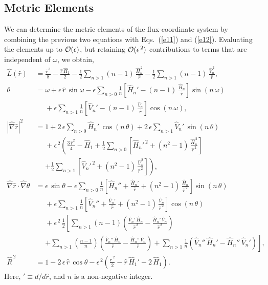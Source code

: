 \documentclass[12pt,prb,aps]{revtex4-1}
\begin{document}
\subsection{Metric Elements}
We can determine the metric elements of the flux-coordinate system by combining the previous two equations with Eqs.~(\ref{e11}) and (\ref{e12}). Evaluating the elements up to ${\cal O}(\epsilon)$, but retaining ${\cal O}(\epsilon^{\,2})$ contributions to terms that are independent of
$\omega$, we obtain,\cite{fitz93,gim}
\begin{align}\label{epdef}
\hat{L}(\hat{r})&= \frac{\hat{r}^{\,3}}{8} -\frac{\hat{r}\,\hat{H}_1}{2}-\frac{1}{2}\sum_{n>1}(n-1)\,\frac{\hat{H}_n^{\,2}}{\hat{r}}
-\frac{1}{2}\sum_{n>1}(n-1)\,\frac{\hat{V}_n^{\,2}}{\hat{r}},\\[0.5ex]
\theta &= \omega+\epsilon\,\hat{r}\,\sin\omega - \epsilon\sum_{n>0}\frac{1}{n}\left[\hat{H}_n'-(n-1)\,\frac{\hat{H}_n}{\hat{r}}\right]\sin(n\,\omega)
\nonumber\\[0.5ex]&\phantom{=}+ \epsilon\sum_{n>1}\frac{1}{n}\left[\hat{V}_n'-(n-1)\,\frac{\hat{V}_n}{\hat{r}}\right]\cos(n\,\omega),\label{e22y}\\[0.5ex]
|\hat{\nabla} \hat{r}|^2 &= 1 +2\,\epsilon\sum_{n>0}\hat{H}_n'\,\cos(n\,\theta) +2\,\epsilon\sum_{n>1}\hat{V}_n'\,\sin(n\,\theta) \nonumber\\[0.5ex]
&\phantom{=}+\epsilon^{\,2}\left(\frac{3\,\hat{r}^2}{4}-\hat{H}_1+
\frac{1}{2}\sum_{n>0}\left[\hat{H}_n'^{\,2}+(n^2-1)\,\frac{\hat{H}_n^{\,2}}{\hat{r}^{\,2}}\right]\right.\nonumber\\[0.5ex]&\phantom{=}\left.+
\frac{1}{2}\sum_{n>1}\left[\hat{V}_n'^{\,2}+(n^2-1)\,\frac{\hat{V}_n^{\,2}}{\hat{r}^{\,2}}\right]
\right),\label{e19}\\[0.5ex]
\hat{\nabla}\hat{r}\cdot\hat{\nabla}\theta&=\epsilon\,\sin\theta
-\epsilon\sum_{n>0}\frac{1}{n}\left[\hat{H}_n''+\frac{\hat{H}_n'}{\hat{r}}+(n^2-1)\,\frac{\hat{H}_n}{\hat{r}^{\,2}}\right]\sin(n\,\theta)\nonumber\\[0.5ex]&
\phantom{=}+\epsilon\sum_{n>1}\frac{1}{n}\left[\hat{V}_n''+\frac{\hat{V}_n'}{\hat{r}}+(n^2-1)\,\frac{\hat{V}_n}{\hat{r}^{\,2}}\right]\cos(n\,\theta)
\nonumber\\[0.5ex]&\phantom{=}
+\epsilon^{\,2}\,\frac{1}{2}\left[\sum_{n>1}(n-1)\left(\frac{\hat{V}_n'\,\hat{H}_n}{\hat{r}^{\,2}}-
\frac{\hat{H}_n'\,\hat{V}_n}{\hat{r}^{\,2}}\right)\right.\nonumber\\[0.5ex]&\phantom{=}\left.
+\sum_{n>1}\left(\frac{n-1}{n}\right)\left(\frac{\hat{V}_n''\,\hat{H}_n}{\hat{r}}-\frac{\hat{H}_n''\,\hat{V}_n}{\hat{r}}\right)
+\sum_{n>1}\frac{1}{n}\left(\hat{V}_n''\,\hat{H}_n'-\hat{H}_n''\,\hat{V}_n'\right)
\right],
\\[0.5ex]
\hat{R}^{\,2}&= 1-2\,\epsilon\,\hat{r}\,\cos\theta -\epsilon^{\,2}\left(\frac{\hat{r}^{\,2}}{2}-\hat{r}\,\hat{H}_1'-2\,\hat{H}_1\right).\label{e25a}
\end{align}
Here, $'\equiv d/d\hat{r}$, and $n$ is a non-negative integer. 
\end{document}
